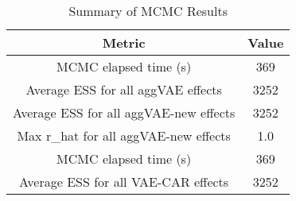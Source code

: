 
\begin{table}[h!]
\centering
\begin{tabular}{|c|c|}
\hline
\textbf{Metric} & \textbf{Value} \\
\hline
MCMC elapsed time (s) & 369 \\
\hline
Average ESS for all aggVAE effects & 3252 \\
\hline
Average ESS for all aggVAE-new effects & 3252 \\
\hline
Max r\_hat for all aggVAE-new effects & 1.0 \\
\hline
MCMC elapsed time (s) & 369 \\
\hline
Average ESS for all VAE-CAR effects & 3252 \\
\hline
\end{tabular}
\caption{Summary of MCMC Results}
\label{table:mcmc_summary}
\end{table}
